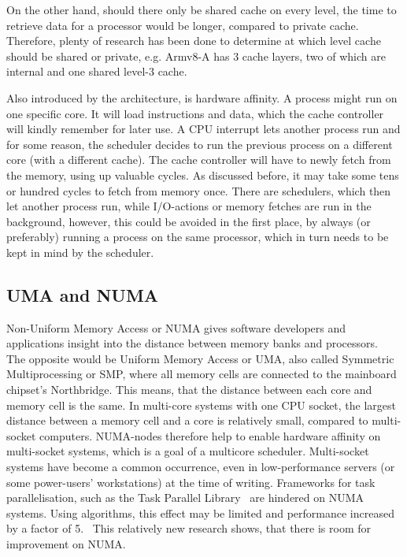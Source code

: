 \documentclass[runningheads]{llncs}
\begin{document}
On the other hand, should there only be shared cache on every level, the time to retrieve data for a
processor would be longer, compared to private cache. Therefore, plenty of research has been done to determine at which level cache should be shared or 
private, e.g. Armv8-A has 3 cache layers, two of which are internal and one shared level-3 cache.~\cite{arm-docs-cache}

Also introduced by the architecture, is hardware affinity. A process might run on one specific core. It will load instructions and data, which the cache controller will kindly remember for later use. A CPU interrupt lets another process run and for some reason, the scheduler decides to run the previous process on a different core (with a different cache). The cache controller will have to newly fetch from the memory, using up valuable cycles. As discussed before, it may take some tens or hundred cycles to fetch from memory once. There are schedulers, which then let another process run, while I/O-actions or memory fetches are run in the background, however, this could be avoided in the first place, by always (or preferably) running a process on the same processor, which in turn needs to be kept in mind by the scheduler.~\cite{ostep}

\subsection{UMA and NUMA}
Non-Uniform Memory Access or NUMA gives software developers and applications insight into the distance between memory banks and processors.~\cite{numa-policies-bolosky} The opposite would be Uniform Memory Access or UMA, also called Symmetric Multiprocessing or SMP, where all memory cells are connected to the mainboard chipset's Northbridge. This means, that the distance between each core and memory cell is the same. In multi-core systems with one CPU socket, the largest distance between a memory cell and a core is relatively small, compared to multi-socket computers. NUMA-nodes therefore help to enable hardware affinity on multi-socket systems, which is a goal of a multicore scheduler. Multi-socket systems have become a common occurrence, even in low-performance servers (or some power-users' workstations) at the time of writing. Frameworks for task parallelisation, such as the Task Parallel Library~\cite{tpl-microsoft} are hindered on NUMA systems. Using algorithms, this effect may be limited and performance increased by a factor of 5.~\cite{scalable-numa} This relatively new research shows, that there is room for improvement on NUMA.
\end{document}
